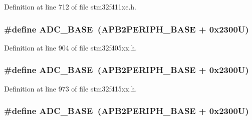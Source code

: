 Definition at line 712 of file stm32f411xe.\+h.

\subsubsection[{\texorpdfstring{A\+D\+C\+\_\+\+B\+A\+SE}{ADC_BASE}}]{\setlength{\rightskip}{0pt plus 5cm}\#define A\+D\+C\+\_\+\+B\+A\+SE~({\bf A\+P\+B2\+P\+E\+R\+I\+P\+H\+\_\+\+B\+A\+SE} + 0x2300\+U)}\hypertarget{group___peripheral__registers__structures_gad06cb9e5985bd216a376f26f22303cd6}{}\label{group___peripheral__registers__structures_gad06cb9e5985bd216a376f26f22303cd6}


Definition at line 904 of file stm32f405xx.\+h.

\subsubsection[{\texorpdfstring{A\+D\+C\+\_\+\+B\+A\+SE}{ADC_BASE}}]{\setlength{\rightskip}{0pt plus 5cm}\#define A\+D\+C\+\_\+\+B\+A\+SE~({\bf A\+P\+B2\+P\+E\+R\+I\+P\+H\+\_\+\+B\+A\+SE} + 0x2300\+U)}\hypertarget{group___peripheral__registers__structures_gad06cb9e5985bd216a376f26f22303cd6}{}\label{group___peripheral__registers__structures_gad06cb9e5985bd216a376f26f22303cd6}


Definition at line 973 of file stm32f415xx.\+h.

\subsubsection[{\texorpdfstring{A\+D\+C\+\_\+\+B\+A\+SE}{ADC_BASE}}]{\setlength{\rightskip}{0pt plus 5cm}\#define A\+D\+C\+\_\+\+B\+A\+SE~({\bf A\+P\+B2\+P\+E\+R\+I\+P\+H\+\_\+\+B\+A\+SE} + 0x2300\+U)}\hypertarget{group___peripheral__registers__structures_gad06cb9e5985bd216a376f26f22303cd6}{}\label{group___peripheral__registers__structures_gad06cb9e5985bd216a376f26f22303cd6}



